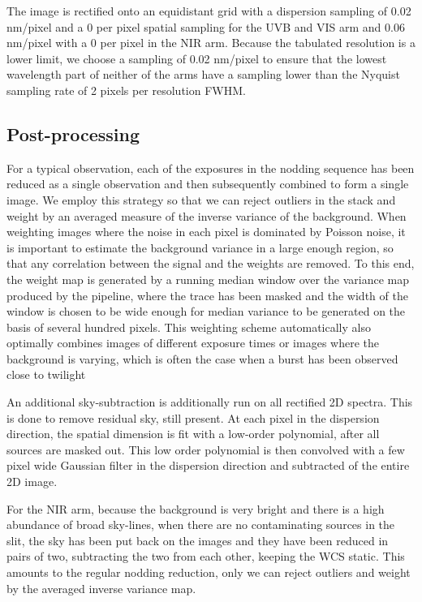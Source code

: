\documentclass{aa}    %
\begin{document}
The image is rectified onto an equidistant grid with a dispersion sampling of
0.02 nm/pixel and a 0 per pixel spatial sampling for the UVB and VIS
arm and 0.06 nm/pixel with a 0 per pixel in the NIR arm.  Because
the tabulated resolution is a lower limit, we choose a sampling of 0.02 nm/pixel
to ensure that the lowest wavelength part of neither of the arms have a sampling
lower than the Nyquist sampling rate of 2 pixels per resolution FWHM.

\subsection{Post-processing} \label{postproc}

For a typical observation, each of the exposures in the nodding sequence has
been reduced as a single observation and then subsequently combined to form a
single image. We employ this strategy so that we can reject outliers in the
stack and weight by an averaged measure of the inverse variance of the
background. When weighting images where the noise in each pixel is dominated by
Poisson noise, it is important to estimate the background variance in a large
enough region, so that any correlation between the signal and the weights are
removed. To this end, the weight map is generated by a running median window
over the variance map produced by the pipeline, where the trace has been masked
and the width of the window is chosen to be wide enough for median variance to
be generated on the basis of several hundred pixels. This weighting scheme
automatically also optimally combines images of different exposure times or
images where the background is varying, which is often the case when a burst has
been observed close to twilight

An additional sky-subtraction is additionally run on all rectified 2D spectra.
This is done to remove residual sky, still present. At each pixel in the
dispersion direction, the spatial dimension is fit with a low-order polynomial,
after all sources are masked out. This low order polynomial is then convolved
with a few pixel wide Gaussian filter in the dispersion direction and subtracted
of the entire 2D image.

For the NIR arm, because the background is very bright and there is a high
abundance of broad sky-lines, when there are no contaminating sources in the
slit, the sky has been put back on the images and they have been reduced in
pairs of two, subtracting the two from each other, keeping the WCS static. This
amounts to the regular nodding reduction, only we can reject outliers and weight
by the averaged inverse variance map.
\end{document}
